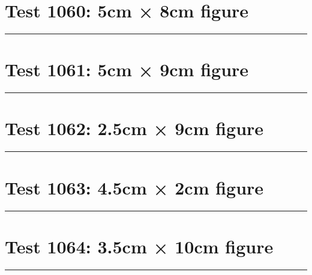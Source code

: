 \documentclass[a4paper,11pt]{article}
\begin{document}
\section*{Test 1060: 5cm × 8cm figure}
\begin{swarmwrap}%
  \begin{minipage}[t]{5cm}
    \centering
    \rule{\linewidth}{8cm}
  \end{minipage}%
\end{swarmwrap}%
\swarmwrapnext
\lipsum[33]
\lipsum[34]
\lipsum[35]
\section*{Test 1061: 5cm × 9cm figure}
\begin{swarmwrap}%
  \begin{minipage}[t]{5cm}
    \centering
    \rule{\linewidth}{9cm}
  \end{minipage}%
\end{swarmwrap}%
\swarmwrapnext
\lipsum[131]
\lipsum[132]
\lipsum[133]
\lipsum[134]
\lipsum[135]
\lipsum[136]
\section*{Test 1062: 2.5cm × 9cm figure}
\begin{swarmwrap}%
  \begin{minipage}[t]{2cm}
    \centering
    \rule{\linewidth}{9cm}
  \end{minipage}%
\end{swarmwrap}%
\swarmwrapnext
\lipsum[137]
\lipsum[138]
\lipsum[139]
\section*{Test 1063: 4.5cm × 2cm figure}
\begin{swarmwrap}%
  \begin{minipage}[t]{4cm}
    \centering
    \rule{\linewidth}{2cm}
  \end{minipage}%
\end{swarmwrap}%
\swarmwrapnext
\lipsum[1]
\lipsum[2]
\lipsum[3]
\lipsum[4]
\lipsum[5]
\lipsum[6]
\section*{Test 1064: 3.5cm × 10cm figure}
\begin{swarmwrap}%
  \begin{minipage}[t]{3cm}
    \centering
    \rule{\linewidth}{10cm}
  \end{minipage}%
\end{swarmwrap}%
\swarmwrapnext
\lipsum[150]
\lipsum[1]
\lipsum[2]
\lipsum[3]
\end{document}
